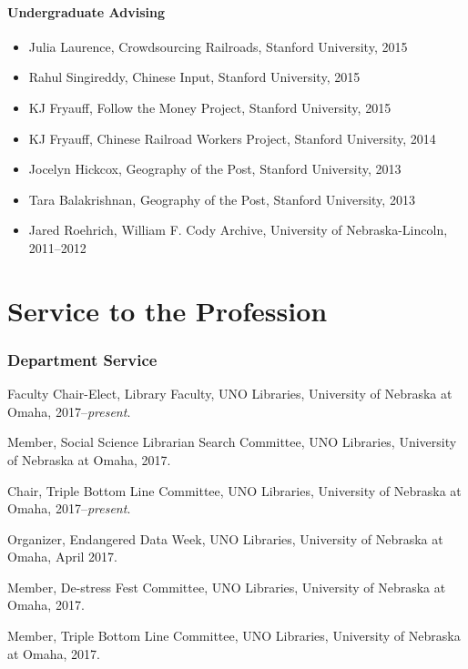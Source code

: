 \paragraph{Undergraduate Advising}\label{undergraduate-advising}

\begin{itemize}
\tightlist
\item
  Julia Laurence, Crowdsourcing Railroads, Stanford University, 2015
\item
  Rahul Singireddy, Chinese Input, Stanford University, 2015
\item
  KJ Fryauff, Follow the Money Project, Stanford University, 2015
\item
  KJ Fryauff, Chinese Railroad Workers Project, Stanford University,
  2014
\item
  Jocelyn Hickcox, Geography of the Post, Stanford University, 2013
\item
  Tara Balakrishnan, Geography of the Post, Stanford University, 2013
\item
  Jared Roehrich, William F. Cody Archive, University of
  Nebraska-Lincoln, 2011--2012
\end{itemize}

\section{Service to the Profession}\label{service-to-the-profession}

\subsubsection{Department Service}\label{department-service}

Faculty Chair-Elect, Library Faculty, UNO Libraries, University of
Nebraska at Omaha, 2017--\emph{present}.

Member, Social Science Librarian Search Committee, UNO Libraries,
University of Nebraska at Omaha, 2017.

Chair, Triple Bottom Line Committee, UNO Libraries, University of
Nebraska at Omaha, 2017--\emph{present}.

Organizer, Endangered Data Week, UNO Libraries, University of Nebraska
at Omaha, April 2017.

Member, De-stress Fest Committee, UNO Libraries, University of Nebraska
at Omaha, 2017.

Member, Triple Bottom Line Committee, UNO Libraries, University of
Nebraska at Omaha, 2017.

